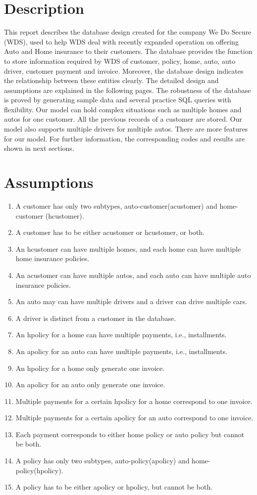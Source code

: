 \documentclass[12pt,english, openany]{book}
\begin{document}
\chapter{Description}
This report describes the database design created for the company We Do Secure (WDS), used to help WDS deal with recently expanded operation on offering Auto and Home insurance to their customers. The database provides the function to store information required by WDS of customer, policy, home, auto, auto driver, customer payment and invoice. Moreover, the database design indicates the relationship between these entities clearly. The detailed design and assumptions are explained in the following pages. The robustness of the database is proved by generating sample data and several practice SQL queries with flexibility. Our model can hold complex situations such as multiple homes and autos for one customer. All the previous records of a customer are stored. Our model also supports multiple drivers for multiple autos. There are more features for our model. For further information, the corresponding codes and results are shown in next sections.


\chapter{Assumptions}
\begin{enumerate}
    \item A customer has only two subtypes, auto-customer(acustomer) and home-customer (hcustomer).
    \item A customer has to be either acustomer or hcustomer, or both.
    \item An hcustomer can have multiple homes, and each home can have multiple home insurance policies.
    \item An acustomer can have multiple autos, and each auto can have multiple auto insurance policies.
    \item An auto may can have multiple drivers and a driver can drive multiple cars.
    \item A driver is distinct from a customer in the database.
    \item An hpolicy for a home can have multiple payments, i.e., installments.
    \item An apolicy for an auto can have multiple payments, i.e., installments.
    \item An hpolicy for a home only generate one invoice.
    \item An apolicy for an auto only generate one invoice.
    \item Multiple payments for a certain hpolicy for a home correspond to one invoice.
    \item Multiple payments for a certain apolicy for an auto correspond to one invoice.
    \item Each payment corresponds to either home policy or auto policy but cannot be both.
    \item A policy has only two subtypes, auto-policy(apolicy) and home-policy(hpolicy).
    \item A policy has to be either apolicy or hpolicy, but cannot be both.
\end{enumerate}
\end{document}
